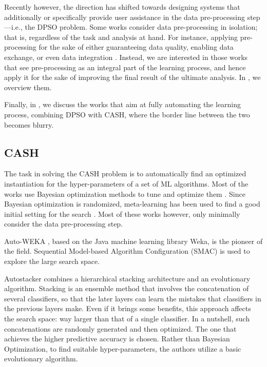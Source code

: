 Recently however, the direction has shifted towards designing systems that additionally or specifically provide user assistance in the data pre-processing step---i.e., the DPSO problem.
Some works consider data pre-processing in isolation; that is, regardless of the task and analysis at hand.
For instance, applying pre-processing for the sake of either guaranteeing data quality, enabling data exchange, or even data integration \cite{Llunatic13VLDBEnd,BigDansing15SIGMOD,Katara15SIGMOD,Foofah17SIGMOD}.
Instead, we are interested in those works that see pre-processing as an integral part of the learning process, and hence apply it for the sake of improving the final result of the ultimate analysis.
In , we overview them.

Finally, in , we discuss the works that aim at fully automating the learning process, combining DPSO with CASH, where the border line between the two becomes blurry.

\subsection{CASH}
\label{effective-ssec:cash}
The task in solving the CASH problem is to automatically find an optimized instantiation for the hyper-parameters of a set of ML algorithms.
Most of the works use Bayesian optimization methods to tune and optimize them \cite{Feurer15AutoSklearn,Thornton13AutoWeka,Olson16Tpot}.
Since Bayesian optimization is randomized, meta-learning has been used to find a good initial setting for the search \cite{Feurer15AAAI}.
Most of these works however, only minimally consider the data pre-processing step.

Auto-WEKA \cite{Thornton13AutoWeka}, based on the Java machine learning library Weka, is the pioneer of the field.
Sequential Model-based Algorithm Configuration (SMAC) is used to explore the large search space.

Autostacker \cite{chen2018autostacker} combines a hierarchical stacking architecture and an evolutionary algorithm.
Stacking is an ensemble method that involves the concatenation of several classifiers, so that the later layers can learn the mistakes that classifiers in the previous layers make.
Even if it brings some benefits, this approach affects the search space: way larger than that of a single classifier.
In a nutshell, such concatenations are randomly generated and then optimized.
The one that achieves the higher predictive accuracy is chosen.
Rather than Bayesian Optimization, to find suitable hyper-parameters, the authors utilize a basic evolutionary algorithm.

